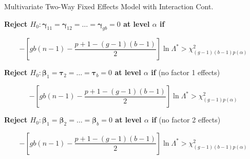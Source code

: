 \documentclass[8pt]{beamer}
\begin{document}
    \begin{frame}{Multivariate Two-Way Fixed Effects Model with Interaction Cont.}
    
    \textbf{Reject $H_{0}: \mathbf{\gamma}_{11} = \mathbf{\gamma}_{12} = \hdots = \mathbf{\gamma}_{gb} = 0$ at level $\alpha$ if}
    
        \begin{equation}
            -\left[gb(n -1) - \frac{p + 1 - (g - 1)(b - 1)}{2}\right]\ln{\Lambda^{*} > \chi^{2}_{(g - 1)(b - 1)p(\alpha)}}
        \end{equation}
        
    \textbf{Reject $H_{0}: \mathbf{\beta}_{1} = \mathbf{\tau}_{2} = \hdots = \mathbf{\tau}_{b} = 0$ at level $\alpha$ if} (no factor 1 effects)
    
        \begin{equation}
            -\left[gb(n -1) - \frac{p + 1 - (g - 1)(b - 1)}{2}\right]\ln{\Lambda^{*} > \chi^{2}_{(g - 1)p(\alpha)}}
        \end{equation}
    
    \textbf{Reject $H_{0}: \mathbf{\beta}_{1} = \mathbf{\beta}_{2} = \hdots = \mathbf{\beta}_{b} = 0$ at level $\alpha$ if} (no factor 2 effects)
    
        \begin{equation}
            -\left[gb(n -1) - \frac{p + 1 - (g - 1)(b - 1)}{2}\right]\ln{\Lambda^{*} > \chi^{2}_{(g - 1)(b - 1)p(\alpha)}}
        \end{equation}
    \end{frame}
    
\end{document}
